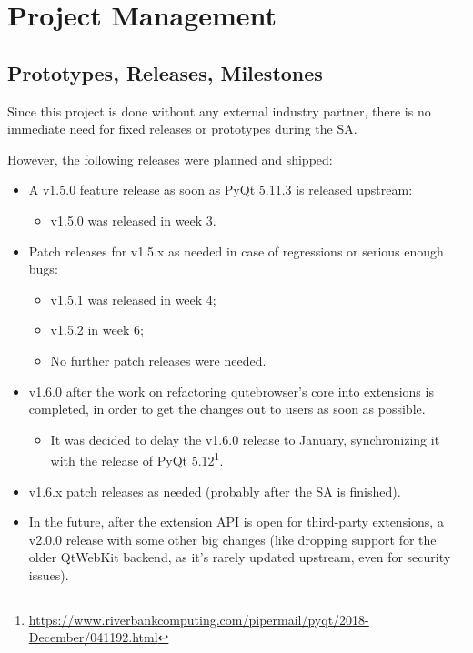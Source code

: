 
\chapter{Project Management}
\label{ch:projectman}

\section{Prototypes, Releases, Milestones}
Since this project is done without any external industry partner, there is no
immediate need for fixed releases or prototypes during the SA.

However, the following releases were planned and shipped:

\begin{itemize}
  \item A v1.5.0 feature release as soon as PyQt 5.11.3 is released upstream:
    \begin{itemize}
      \item v1.5.0 was released in week 3.
    \end{itemize}
  \item Patch releases for v1.5.x as needed in case of regressions or serious
    enough bugs:
    \begin{itemize}
      \item v1.5.1 was released in week 4;
      \item v1.5.2 in week 6;
      \item No further patch releases were needed.
    \end{itemize}
  \item v1.6.0 after the work on refactoring qutebrowser's core into extensions
    is completed, in order to get the changes out to users as soon as possible.
    \begin{itemize}
      \item It was decided to delay the v1.6.0 release to January, synchronizing
        it with the release of PyQt
        5.12\footnote{\url{https://www.riverbankcomputing.com/pipermail/pyqt/2018-December/041192.html}}.
    \end{itemize}
  \item v1.6.x patch releases as needed (probably after the SA is finished).
  \item In the future, after the extension API is open for third-party
    extensions, a v2.0.0 release with some other big changes (like dropping support
    for the older QtWebKit backend, as it's rarely updated upstream, even for
    security issues).
\end{itemize}

